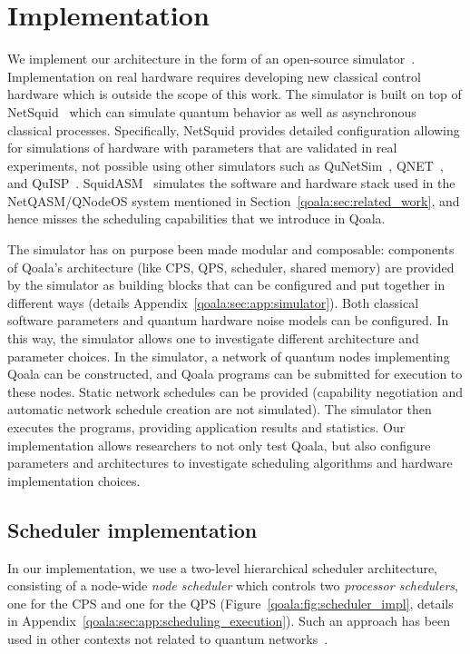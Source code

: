 \section{Implementation}
\label{qoala:sec:implementation}
We implement our architecture in the form of an open-source simulator~\cite{qoala2023simulator}.
Implementation on real hardware requires developing new classical control hardware which is outside the scope of this work.
The simulator is built on top of NetSquid~\cite{coopmans2021netsquid} which can simulate quantum behavior as well as asynchronous classical processes.
Specifically, NetSquid provides detailed configuration allowing for simulations of hardware with parameters that are validated in real experiments, not possible using other simulators such as QuNetSim~\cite{diadamo2021qunetsim}, QNET~\cite{QNET}, and QuISP~\cite{satoh2022quisp}.
SquidASM~\cite{squidasmrepo} simulates the software and hardware stack used in the NetQASM/QNodeOS system mentioned in Section~\ref{qoala:sec:related_work}, and hence misses the scheduling capabilities that we introduce in Qoala.

The simulator has on purpose been made modular and composable:
components of Qoala's architecture (like CPS, QPS, scheduler, shared memory) are provided by the simulator as building blocks that can be configured and put together in different ways (details Appendix~\ref{qoala:sec:app:simulator}).
Both classical software parameters and quantum hardware noise models can be configured.
In this way, the simulator allows one to investigate different architecture and parameter choices.
In the simulator, a network of quantum nodes implementing Qoala can be constructed, and Qoala programs can be submitted for execution to these nodes.
Static network schedules can be provided (capability negotiation and automatic network schedule creation are not simulated).
The simulator then executes the programs, providing application results and statistics.
Our implementation allows researchers to not only test Qoala, but also configure parameters and architectures to investigate scheduling algorithms and hardware implementation choices.

\subsection{Scheduler implementation}
In our implementation, we use a two-level hierarchical scheduler architecture,
consisting of a node-wide \textit{node scheduler} which controls two \textit{processor schedulers}, one for the CPS and one for the QPS (Figure~\ref{qoala:fig:scheduler_impl}, details in Appendix~\ref{qoala:sec:app:scheduling_execution}).
Such an approach has been used in other contexts not related to quantum networks~\cite{polychronopoulos1991hierarchical, girkar1994hierarchical}.

